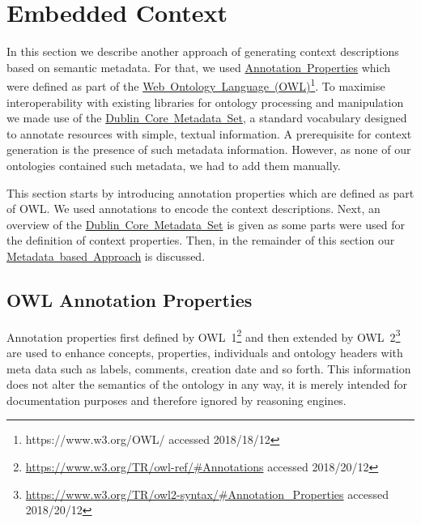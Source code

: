 \section{Embedded Context}\label{sec:embedded_context}
In this section we describe another approach of generating context descriptions based on semantic metadata.
For that, we used \hyperref[sec:OWL_annotation_properties]{Annotation~Properties} which were defined as part of the \hyperref[sec:OWL_annotation_properties]{Web~Ontology~Language~(OWL)\footnote{\url{https://www.w3.org/OWL/} accessed 2018/18/12}}. To maximise interoperability with existing libraries for ontology processing and manipulation we made use of the \hyperref[sec:dublin_core_metadata_vocabulary]{Dublin~Core~Metadata~Set}, a standard vocabulary designed to annotate resources with simple, textual information. A prerequisite for context generation is the presence of such metadata information.
However, as none of our ontologies contained such metadata, we had to add them manually. 

This section starts by introducing annotation properties which are defined as part of OWL. We used annotations to encode the context descriptions. Next, an overview of the \hyperref[sec:dublin_core_metadata_vocabulary]{Dublin~Core~Metadata~Set} is given as some parts were used for the definition of context properties. Then, in the remainder of this section our \hyperref[sec:enrichment_metaData_approach]{Metadata~based~Approach} is discussed.

\subsection{OWL Annotation Properties}\label{sec:OWL_annotation_properties}
Annotation properties first defined by OWL~1\footnote{\url{https://www.w3.org/TR/owl-ref/\#Annotations} accessed 2018/20/12} and then extended by OWL~2\footnote{\url{https://www.w3.org/TR/owl2-syntax/\#Annotation_Properties} accessed 2018/20/12} are used to enhance concepts, properties, individuals and ontology headers with meta data such as labels, comments, creation date and so forth. This information does not alter the semantics of the ontology in any way, it is merely intended for documentation purposes and therefore ignored by reasoning engines. 

